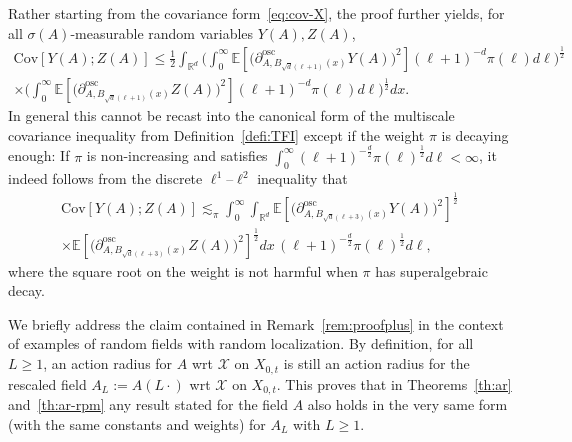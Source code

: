 \documentclass[AHL,Unicode,longabstracts]{cedram}
\newcommand{\R}{\mathbb R}
\newcommand{\expec}[1]{\mathbb{E}\left[#1 \right]}
\newcommand{\X}{\mathcal X}
\newcommand{\osc}{\partial^{\mathrm{osc}}}
\newcommand{\oscd}[1]{\mathrel{\osc_{#1}}}
\newcommand{\cov}[2]{\mathrm{Cov}\left[#1;#2\right]}
\begin{document}
\begin{rema}\label{rem:cov-alm}
Rather starting from the covariance form~\eqref{eq:cov-X}, the proof further yields, for all $\sigma(A)$-measurable random variables $Y(A),Z(A)$,
\begin{multline*}
\cov{Y(A)}{Z(A)}\le \frac12\int_{\R^d}\bigg(\int_0^\infty\expec{\Big(\oscd{A,B_{\sqrt d(\ell+1)}(x)}Y(A)\Big)^2}(\ell+1)^{-d}\pi(\ell) d\ell\bigg)^\frac12\\
\times\bigg(\int_0^\infty\expec{\Big(\oscd{A,B_{\sqrt d(\ell+1)}(x)}Z(A)\Big)^2}(\ell+1)^{-d}\pi(\ell) d\ell\bigg)^\frac12dx.
\end{multline*}
In general this cannot be recast into the canonical form of the multiscale covariance inequality from Definition~\ref{defi:TFI} except if the weight $\pi$ is decaying enough: If $\pi$ is non-increasing and satisfies $\int_0^\infty(\ell+1)^{-\frac d2}\pi(\ell)^\frac12d\ell<\infty$, it indeed follows from the discrete $\ell^1$--$\ell^2$ inequality that
\begin{multline*}
\cov{Y(A)}{Z(A)}\lesssim_\pi \int_0^\infty\int_{\R^d}\expec{\Big(\oscd{A,B_{\sqrt d(\ell+3)}(x)}Y(A)\Big)^2}^\frac12\\
\times \expec{\Big(\oscd{A,B_{\sqrt d(\ell+3)}(x)}Z(A)\Big)^2}^\frac12dx\,(\ell+1)^{-\frac d2}\pi(\ell)^\frac12 d\ell,
\end{multline*}
where the square root on the weight is not harmful when $\pi$ has superalgebraic decay.
\end{rema}

\begin{rema}\label{rem:rescale-1}
We briefly address the claim contained in Remark~\ref{rem:proofplus} in the context of examples of random fields with random localization. By definition, for all $L\ge1$, an action radius for $A$ wrt $\X$ on $X_{0,t}$ is still an action radius for the rescaled field $A_L:=A(L\cdot)$ wrt $\X$ on $X_{0,t}$. This proves that in Theorems~\ref{th:ar} and~\ref{th:ar-rpm} any result stated for the field $A$ also holds in the very same form (with the same constants and weights) for $A_L$ with $L\ge1$.
\end{rema}
\end{document}
